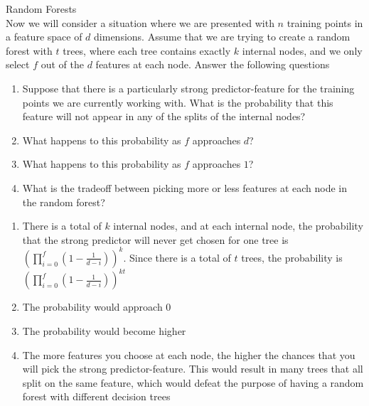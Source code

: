 \begin{Parts}
\Part Random Forests \\
Now we will consider a situation where we are presented with $n$ training points in a feature space of $d$ dimensions. Assume that we are trying to create a random forest with $t$ trees, where each tree contains exactly $k$ internal nodes, and we only select $f$ out of the $d$ features at each node. Answer the following questions
\begin{enumerate}
    \item Suppose that there is a particularly strong predictor-feature for the training points we are currently working with. What is the probability that this feature will not appear in any of the splits of the internal nodes?
    \item What happens to this probability as $f$ approaches $d$?
    \item What happens to this probability as $f$ approaches $1$?
    \item What is the tradeoff between picking more or less features at each node in the random forest?
\end{enumerate}

\begin{solution}
    \begin{enumerate}
        \item There is a total of $k$ internal nodes, and at each internal node, the probability that the strong predictor will never get chosen for one tree is $(\prod^f_{i = 0}(1 - \frac{1}{d - i}))^k$. Since there is a total of $t$ trees, the probability is $(\prod^f_{i = 0}(1 - \frac{1}{d - i}))^{kt}$
        \item The probability would approach $0$
        \item The probability would become higher
        \item The more features you choose at each node, the higher the chances that you will pick the strong predictor-feature. This would result in many trees that all split on the same feature, which would defeat the purpose of having a random forest with different decision trees
    \end{enumerate}
\end{solution}


\end{Parts}

